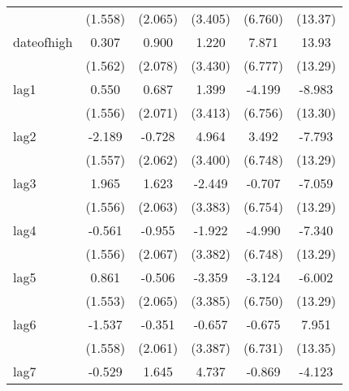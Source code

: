 {\begin{tabular}{l*{5}{c}}
            &     (1.558)         &     (2.065)         &     (3.405)         &     (6.760)         &     (13.37)         \\
[1em]
dateofhigh  &       0.307         &       0.900         &       1.220         &       7.871         &       13.93         \\
            &     (1.562)         &     (2.078)         &     (3.430)         &     (6.777)         &     (13.29)         \\
[1em]
lag1        &       0.550         &       0.687         &       1.399         &      -4.199         &      -8.983         \\
            &     (1.556)         &     (2.071)         &     (3.413)         &     (6.756)         &     (13.30)         \\
[1em]
lag2        &      -2.189         &      -0.728         &       4.964         &       3.492         &      -7.793         \\
            &     (1.557)         &     (2.062)         &     (3.400)         &     (6.748)         &     (13.29)         \\
[1em]
lag3        &       1.965         &       1.623         &      -2.449         &      -0.707         &      -7.059         \\
            &     (1.556)         &     (2.063)         &     (3.383)         &     (6.754)         &     (13.29)         \\
[1em]
lag4        &      -0.561         &      -0.955         &      -1.922         &      -4.990         &      -7.340         \\
            &     (1.556)         &     (2.067)         &     (3.382)         &     (6.748)         &     (13.29)         \\
[1em]
lag5        &       0.861         &      -0.506         &      -3.359         &      -3.124         &      -6.002         \\
            &     (1.553)         &     (2.065)         &     (3.385)         &     (6.750)         &     (13.29)         \\
[1em]
lag6        &      -1.537         &      -0.351         &      -0.657         &      -0.675         &       7.951         \\
            &     (1.558)         &     (2.061)         &     (3.387)         &     (6.731)         &     (13.35)         \\
[1em]
lag7        &      -0.529         &       1.645         &       4.737         &      -0.869         &      -4.123         \\

\end{tabular}}
